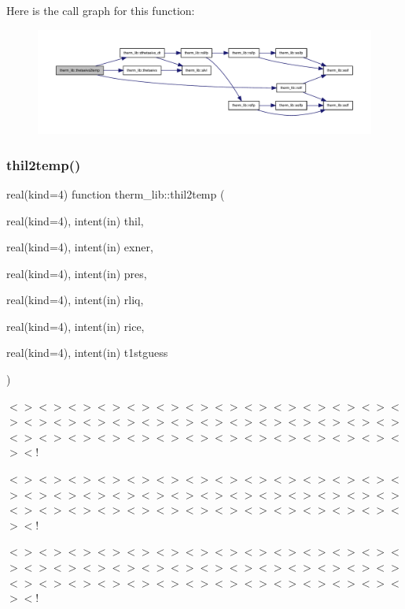 Here is the call graph for this function\+:
\nopagebreak
\begin{figure}[H]
\begin{center}
\leavevmode
\includegraphics[width=350pt]{namespacetherm__lib_a8067ee37cd0529f1940178817b175cbc_cgraph}
\end{center}
\end{figure}
\mbox{\label{namespacetherm__lib_ac1f38c4afbbc3cf5a540d4e87c8b22c8}} 
\subsubsection{\texorpdfstring{thil2temp()}{thil2temp()}}
{\footnotesize\ttfamily real(kind=4) function therm\+\_\+lib\+::thil2temp (\begin{DoxyParamCaption}\item[{real(kind=4), intent(in)}]{thil,  }\item[{real(kind=4), intent(in)}]{exner,  }\item[{real(kind=4), intent(in)}]{pres,  }\item[{real(kind=4), intent(in)}]{rliq,  }\item[{real(kind=4), intent(in)}]{rice,  }\item[{real(kind=4), intent(in)}]{t1stguess }\end{DoxyParamCaption})}

$<$$>$$<$$>$$<$$>$$<$$>$$<$$>$$<$$>$$<$$>$$<$$>$$<$$>$$<$$>$$<$$>$$<$$>$$<$$>$$<$$>$$<$$>$$<$$>$$<$$>$$<$$>$$<$$>$$<$$>$$<$$>$$<$$>$$<$$>$$<$$>$$<$$>$$<$$>$$<$$>$$<$$>$$<$$>$$<$$>$$<$$>$$<$$>$$<$$>$$<$$>$$<$$>$$<$$>$$<$$>$$<$$>$$<$$>$$<$$>$$<$$>$$<$!

$<$$>$$<$$>$$<$$>$$<$$>$$<$$>$$<$$>$$<$$>$$<$$>$$<$$>$$<$$>$$<$$>$$<$$>$$<$$>$$<$$>$$<$$>$$<$$>$$<$$>$$<$$>$$<$$>$$<$$>$$<$$>$$<$$>$$<$$>$$<$$>$$<$$>$$<$$>$$<$$>$$<$$>$$<$$>$$<$$>$$<$$>$$<$$>$$<$$>$$<$$>$$<$$>$$<$$>$$<$$>$$<$$>$$<$$>$$<$$>$$<$$>$$<$!

$<$$>$$<$$>$$<$$>$$<$$>$$<$$>$$<$$>$$<$$>$$<$$>$$<$$>$$<$$>$$<$$>$$<$$>$$<$$>$$<$$>$$<$$>$$<$$>$$<$$>$$<$$>$$<$$>$$<$$>$$<$$>$$<$$>$$<$$>$$<$$>$$<$$>$$<$$>$$<$$>$$<$$>$$<$$>$$<$$>$$<$$>$$<$$>$$<$$>$$<$$>$$<$$>$$<$$>$$<$$>$$<$$>$$<$$>$$<$$>$$<$$>$$<$!

